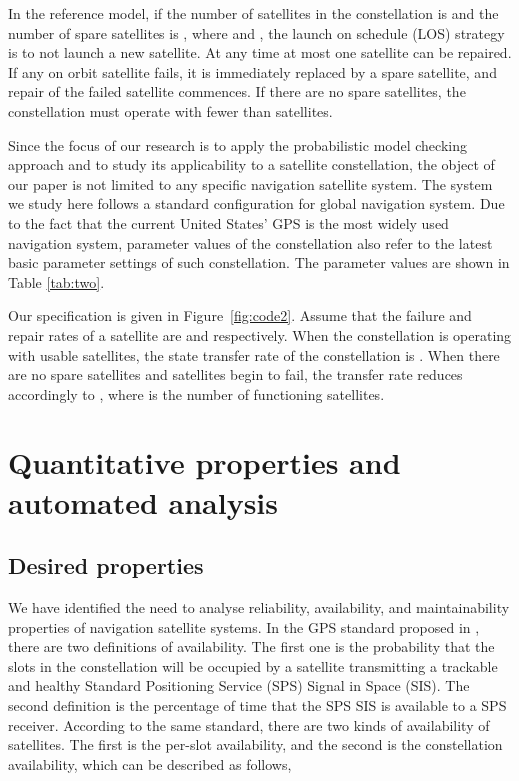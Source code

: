 \documentclass[preprint,12pt]{qrei}
\begin{document}
In the reference model, if the number of satellites in the constellation is  and the number of spare satellites is , where  and , the launch on schedule (LOS) strategy is to not launch a new satellite. At any time at most one satellite can be repaired. If any on orbit satellite fails, it is immediately replaced by a spare satellite, and repair of the failed satellite commences. If there are no spare satellites, the constellation must operate with fewer than  satellites.

Since the focus of our research is to apply the probabilistic model checking approach and to study its applicability to a satellite constellation, the object of our paper is not limited to any specific navigation satellite system. The system we study here follows a standard configuration for global navigation system. Due to the fact that the current United States' GPS is the most widely used navigation system, parameter values of the constellation also refer to the latest basic parameter settings of such constellation. The parameter values are shown in Table \ref{tab:two}.

Our  specification is given in Figure~\ref{fig:code2}. Assume that the failure and repair rates of a satellite are  and  respectively. When the constellation is operating with  usable satellites, the state transfer rate of the constellation is . When there are no spare satellites and satellites begin to fail, the transfer rate reduces accordingly to , where  is the number of functioning satellites.



\section{Quantitative properties and automated analysis}
\label{sect:lspar}

\subsection{Desired properties}

We have identified the need to analyse reliability, availability, and maintainability properties of navigation satellite systems. In the GPS standard proposed in \cite{SIS08}, there are two definitions of availability. The first one is the probability that the slots in the constellation will be occupied by a satellite transmitting a trackable and healthy Standard Positioning Service (SPS) Signal in Space (SIS). The second definition is the percentage of time that the SPS SIS is available to a SPS receiver. According to the same standard, there are two kinds of availability of satellites. The first is the per-slot availability, and the second is the constellation availability, which can be described as follows,
\end{document}
